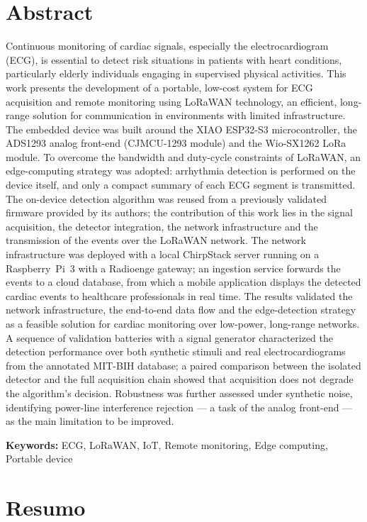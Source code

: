 \cleardoublepage
\chapter*{Abstract}

    Continuous monitoring of cardiac signals, especially the electrocardiogram (ECG), is essential to detect risk situations in patients with heart conditions, particularly elderly individuals engaging in supervised physical activities. This work presents the development of a portable, low-cost system for ECG acquisition and remote monitoring using LoRaWAN technology, an efficient, long-range solution for communication in environments with limited infrastructure. The embedded device was built around the XIAO ESP32-S3 microcontroller, the ADS1293 analog front-end (CJMCU-1293 module) and the Wio-SX1262 LoRa module. To overcome the bandwidth and duty-cycle constraints of LoRaWAN, an edge-computing strategy was adopted: arrhythmia detection is performed on the device itself, and only a compact summary of each ECG segment is transmitted. The on-device detection algorithm was reused from a previously validated firmware provided by its authors; the contribution of this work lies in the signal acquisition, the detector integration, the network infrastructure and the transmission of the events over the LoRaWAN network. The network infrastructure was deployed with a local ChirpStack server running on a Raspberry~Pi~3 with a Radioenge gateway; an ingestion service forwards the events to a cloud database, from which a mobile application displays the detected cardiac events to healthcare professionals in real time. The results validated the network infrastructure, the end-to-end data flow and the edge-detection strategy as a feasible solution for cardiac monitoring over low-power, long-range networks. A sequence of validation batteries with a signal generator characterized the detection performance over both synthetic stimuli and real electrocardiograms from the annotated MIT-BIH database; a paired comparison between the isolated detector and the full acquisition chain showed that acquisition does not degrade the algorithm's decision. Robustness was further assessed under synthetic noise, identifying power-line interference rejection --- a task of the analog front-end --- as the main limitation to be improved.

\textbf{Keywords:} ECG, LoRaWAN, IoT, Remote monitoring, Edge computing, Portable device

\cleardoublepage
\chapter*{Resumo}

